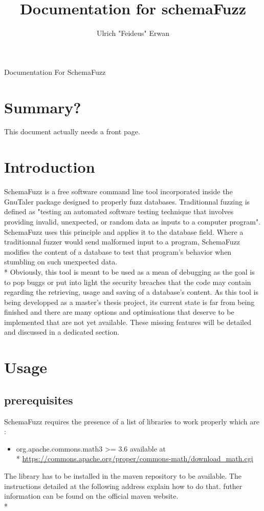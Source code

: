 \documentclass{article}
\title{Documentation for schemaFuzz}
\author{Ulrich "Feideus" Erwan}
\begin{document}
	
\maketitle Documentation For SchemaFuzz
	\section{Summary?}
		This document actually needs a front page.
	\section{Introduction}
	
SchemaFuzz is a free software command line tool incorporated inside the 		GnuTaler package designed to properly fuzz databases.
Traditionnal fuzzing is defined as "testing an automated software testing		technique that involves providing invalid, unexpected, or random data as 		inputs to a computer program". SchemaFuzz uses this principle and applies it to the database field.
Where a traditionnal fuzzer would send malformed input to a program, SchemaFuzz modifies the content of a database to test that program's behavior when stumbling on such unexpected data. \\*
Obviously, this tool is meant to be used as a mean of debugging as the goal is to pop buggs or put into light the security breaches that the code may contain regarding the retrieving, usage and saving of a database's content.
As this tool is being developped as a master's thesis project, its current state is far from being finished and there are many options and optimisations that deserve to be implemented that are not yet available.
These missing features will be detailed and discussed in a dedicated section.

	\section{Usage}
		\subsection{prerequisites}
			SchemaFuzz requires the presence of a list of libraries to work 				properly which are :
			\begin{itemize}
			\item org.apache.commons.math3 >= 3.6
			available at \\*
			\url{https://commons.apache.org/proper/commons-math/download_math.cgi}			
			\end{itemize}
The library has to be installed in the maven repository to be available. The instructions detailed at the following address explain how to do that. futher information can be found on the official maven website.\\*
\end{document}
